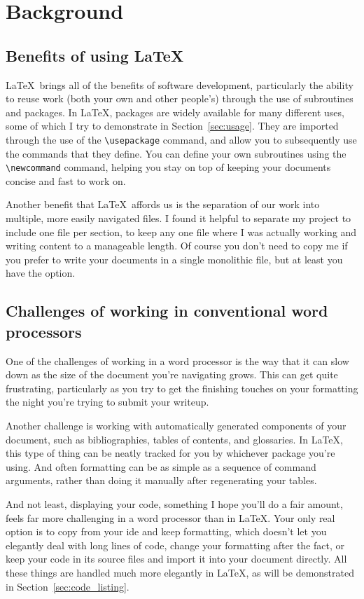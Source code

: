 \section{Background}
\label{sec:background}

\subsection{Benefits of using LaTeX}

\LaTeX\ brings all of the benefits of software development, particularly the ability to reuse work
(both your own and other people's) through the use of subroutines and packages. In \LaTeX, packages
are widely available for many different uses, some of which I try to demonstrate in
Section~\ref{sec:usage}. They are imported through the use of the \verb*|\usepackage| command, and
allow you to subsequently use the commands that they define. You can define your own subroutines
using the \verb*|\newcommand| command, helping you stay on top of keeping your documents concise
and fast to work on.

Another benefit that \LaTeX\ affords us is the separation of our work into multiple, more easily
navigated files. I found it helpful to separate my project to include one file per section, to
keep any one file where I was actually working and writing content to a manageable length. Of
course you don't need to copy me if you prefer to write your documents in a single monolithic
file, but at least you have the option.

\subsection{Challenges of working in conventional word processors}

One of the challenges of working in a word processor is the way that it can slow down as the size
of the document you're navigating grows. This can get quite frustrating, particularly as you try
to get the finishing touches on your formatting the night you're trying to submit your writeup.

Another challenge is working with automatically generated components of your document, such as
bibliographies, tables of contents, and glossaries. In \LaTeX, this type of thing can be neatly
tracked for you by whichever package you're using. And often formatting can be as simple as a
sequence of command arguments, rather than doing it manually after regenerating your tables.

And not least, displaying your code, something I hope you'll do a fair amount, feels far more
challenging in a word processor than in \LaTeX. Your only real option is to copy from your
\acrshort{ide} and keep formatting, which doesn't let you elegantly deal with long lines of code,
change your formatting after the fact, or keep your code in its source files and import it into
your document directly. All these things are handled much more elegantly in \LaTeX, as will be
demonstrated in Section~\ref{sec:code_listing}.
